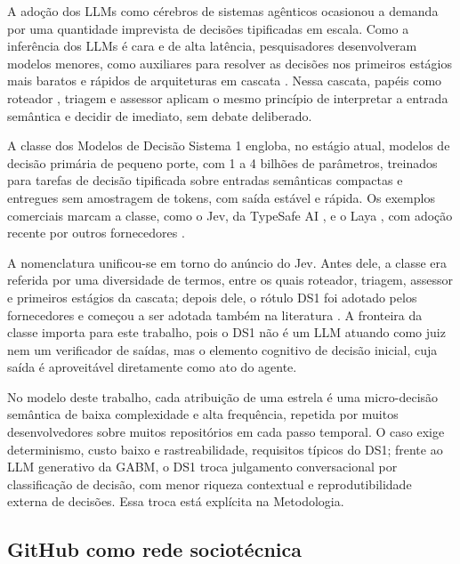 \documentclass[12pt,oneside,a4paper,brazil,sumario=tradicional]{abntex2}
\begin{document}
A adoção dos LLMs como cérebros de sistemas agênticos ocasionou a demanda por uma quantidade imprevista de decisões tipificadas em escala. Como a inferência dos LLMs é cara e de alta latência, pesquisadores desenvolveram modelos menores, como auxiliares para resolver as decisões nos primeiros estágios mais baratos e rápidos de arquiteturas em cascata \parencite{chen2023}. Nessa cascata, papéis como roteador \parencite{ong2025}, triagem e assessor \parencite{nandakishore2026} aplicam o mesmo princípio de interpretar a entrada semântica e decidir de imediato, sem debate deliberado.

A classe dos Modelos de Decisão Sistema 1 engloba, no estágio atual, modelos de decisão primária de pequeno porte, com 1 a 4 bilhões de parâmetros, treinados para tarefas de decisão tipificada sobre entradas semânticas compactas e entregues sem amostragem de tokens, com saída estável e rápida. Os exemplos comerciais marcam a classe, como o Jev, da TypeSafe AI \parencite{typesafe2026}, e o Laya \parencite{laya2026}, com adoção recente por outros fornecedores \parencite{microsoft2026, cloudflare2026, openai2026}.

A nomenclatura unificou-se em torno do anúncio do Jev. Antes dele, a classe era referida por uma diversidade de termos, entre os quais roteador, triagem, assessor e primeiros estágios da cascata; depois dele, o rótulo DS1 foi adotado pelos fornecedores e começou a ser adotada também na literatura \parencite{du2026reliable, santos2026, azizi2026labelsoverridedefinitionsjevstyle}. A fronteira da classe importa para este trabalho, pois o DS1 não é um LLM atuando como juiz nem um verificador de saídas, mas o elemento cognitivo de decisão inicial, cuja saída é aproveitável diretamente como ato do agente.

No modelo deste trabalho, cada atribuição de uma estrela é uma micro-decisão semântica de baixa complexidade e alta frequência, repetida por muitos desenvolvedores sobre muitos repositórios em cada passo temporal. O caso exige determinismo, custo baixo e rastreabilidade, requisitos típicos do DS1; frente ao LLM generativo da GABM, o DS1 troca julgamento conversacional por classificação de decisão, com menor riqueza contextual e reprodutibilidade externa de decisões. Essa troca está explícita na Metodologia.

\subsection{GitHub como rede sociotécnica}
\end{document}
